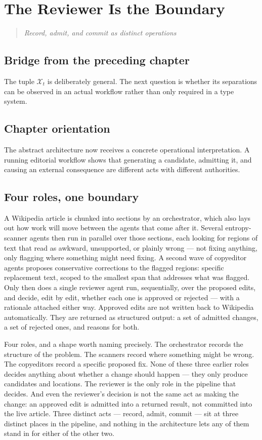 \documentclass[11pt,openany]{book}
\newcommand{\chapterprecis}[1]{\begin{quote}\itshape #1\end{quote}}
\begin{document}
\chapter{The Reviewer Is the Boundary}

\chapterprecis{Record, admit, and commit as distinct operations}

\section*{Bridge from the preceding chapter}

The tuple $\mathcal{X}_t$ is deliberately general. The next question is whether its separations can be observed in an actual workflow rather than only required in a type system.

\section*{Chapter orientation}

The abstract architecture now receives a concrete operational interpretation. A running editorial workflow shows that generating a candidate, admitting it, and causing an external consequence are different acts with different authorities.

\section{Four roles, one boundary}

A Wikipedia article is chunked into sections by an orchestrator, which also lays out how work will move between the agents that come after it. Several entropy-scanner agents then run in parallel over those sections, each looking for regions of text that read as awkward, unsupported, or plainly wrong — not fixing anything, only flagging where something might need fixing. A second wave of copyeditor agents proposes conservative corrections to the flagged regions: specific replacement text, scoped to the smallest span that addresses what was flagged. Only then does a single reviewer agent run, sequentially, over the proposed edits, and decide, edit by edit, whether each one is approved or rejected — with a rationale attached either way. Approved edits are not written back to Wikipedia automatically. They are returned as structured output: a set of admitted changes, a set of rejected ones, and reasons for both.

Four roles, and a shape worth naming precisely. The orchestrator records the structure of the problem. The scanners record where something might be wrong. The copyeditors record a specific proposed fix. None of these three earlier roles decides anything about whether a change should happen — they only produce candidates and locations. The reviewer is the only role in the pipeline that decides. And even the reviewer's decision is not the same act as making the change: an approved edit is admitted into a returned result, not committed into the live article. Three distinct acts — record, admit, commit — sit at three distinct places in the pipeline, and nothing in the architecture lets any of them stand in for either of the other two.
\end{document}
